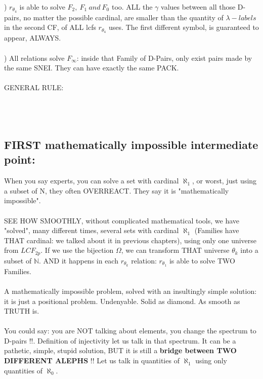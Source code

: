 		)  $r_{\theta_{4}}$ is able to solve $ F_{2},\:F_{1}\:and\:F_{0} $ too. ALL the $\gamma$ values between all those D-pairs, no matter the possible cardinal, are smaller than the quantity of $\lambda-labels$ in the second CF, of ALL lcfs $r_{\theta_{4}}$ uses. The first different symbol, is guaranteed to appear, ALWAYS.
		\\\\
		
		) All relations solve $F_{\infty}$: inside that Family of D-Pairs, only exist pairs made by the same SNEI. They can have exactly the same PACK.
		\\\\
		
		\noindent
		GENERAL RULE:\\\\
		\\\\
		
		\subsection{FIRST mathematically impossible intermediate point:}
		
			\noindent
			When you say experts, you can solve a set with cardinal $\aleph_{1}$, or worst, just using a subset of N, they often OVERREACT. They say it is "mathematically impossible".
			\\\\
			
			\noindent
			SEE HOW SMOOTHLY, without complicated mathematical tools, we have "solved", many different times, several sets with cardinal $\aleph_{1}$ (Families have THAT cardinal: we talked about it in previous chapters), using only one universe from $LCF_{2p}$. If we use the bijection $\Omega$, we can transform THAT universe $\theta_{k}$ into a subset of $\mathbb{N}$. AND it happens in each $r_{\theta_{k}}$ relation: $r_{\theta_{1}}$ is able to solve TWO Families.
			\\\\
			
			\noindent
			A mathematically impossible problem, solved with an insultingly simple solution: it is just a positional problem. Undenyable. Solid as diamond. As smooth as TRUTH is.
			\\\\
			
			\noindent
			You could say: you are NOT talking about elements, you change the spectrum to D-pairs !!. Definition of injectivity let us talk in that spectrum. It can be a pathetic, simple, stupid solution, BUT it is still a \textbf{bridge between TWO DIFFERENT ALEPHS} !! Let us talk in quantities of $\aleph_{1}$ using only quantities of $\aleph_{0}$.
	